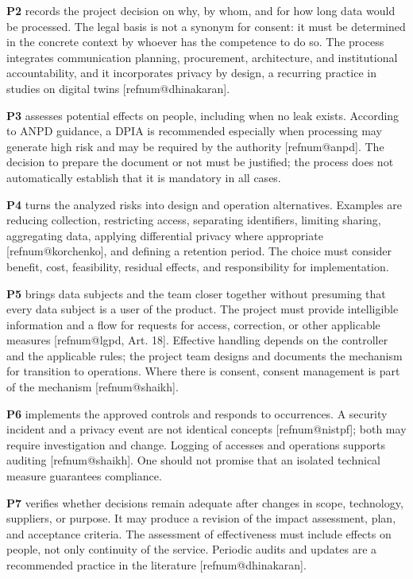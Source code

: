 \documentclass[11pt,a4paper]{article}
\makeatletter
\newcommand{\refnum}[1]{\csname refnum@#1\endcsname}
\makeatother
\begin{document}
\textbf{P2} records the project decision on why, by whom, and for how long data would be processed. The legal basis is not a synonym for consent: it must be determined in the concrete context by whoever has the competence to do so. The process integrates communication planning, procurement, architecture, and institutional accountability, and it incorporates privacy by design, a recurring practice in studies on digital twins [\refnum{dhinakaran}].

\textbf{P3} assesses potential effects on people, including when no leak exists. According to ANPD guidance, a DPIA is recommended especially when processing may generate high risk and may be required by the authority [\refnum{anpd}]. The decision to prepare the document or not must be justified; the process does not automatically establish that it is mandatory in all cases.

\textbf{P4} turns the analyzed risks into design and operation alternatives. Examples are reducing collection, restricting access, separating identifiers, limiting sharing, aggregating data, applying differential privacy where appropriate [\refnum{korchenko}], and defining a retention period. The choice must consider benefit, cost, feasibility, residual effects, and responsibility for implementation.

\textbf{P5} brings data subjects and the team closer together without presuming that every data subject is a user of the product. The project must provide intelligible information and a flow for requests for access, correction, or other applicable measures [\refnum{lgpd}, Art. 18]. Effective handling depends on the controller and the applicable rules; the project team designs and documents the mechanism for transition to operations. Where there is consent, consent management is part of the mechanism [\refnum{shaikh}].

\textbf{P6} implements the approved controls and responds to occurrences. A security incident and a privacy event are not identical concepts [\refnum{nistpf}]; both may require investigation and change. Logging of accesses and operations supports auditing [\refnum{shaikh}]. One should not promise that an isolated technical measure guarantees compliance.

\textbf{P7} verifies whether decisions remain adequate after changes in scope, technology, suppliers, or purpose. It may produce a revision of the impact assessment, plan, and acceptance criteria. The assessment of effectiveness must include effects on people, not only continuity of the service. Periodic audits and updates are a recommended practice in the literature [\refnum{dhinakaran}].
\end{document}
